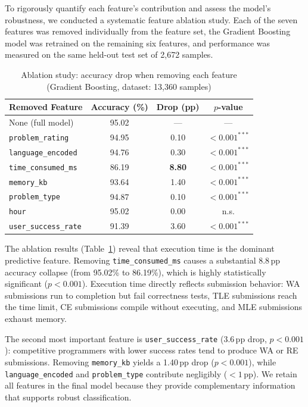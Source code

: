 \documentclass[acmsmall]{acmart}
\begin{document}
To rigorously quantify each feature's contribution and assess the model's
robustness, we conducted a systematic feature ablation study. Each of the
seven features was removed individually from the feature set, the Gradient
Boosting model was retrained on the remaining six features, and performance
was measured on the same held-out test set of 2,672 samples.

\begin{table}[htbp]
\centering
\caption{Ablation study: accuracy drop when removing each feature
         (Gradient Boosting, dataset: 13,360 samples)}
\label{tab:ablation}
\begin{tabular}{@{}lccc@{}}
\toprule
Removed Feature & Accuracy (\%) & Drop (pp) & $p$-value \\
\midrule
None (full model)         & 95.02 & ---    & --- \\
\texttt{problem\_rating}    & 94.95 & 0.10   & $<0.001^{***}$ \\
\texttt{language\_encoded}& 94.76 & 0.30   & $<0.001^{***}$ \\
\texttt{time\_consumed\_ms}& 86.19 & \textbf{8.80} & $<0.001^{***}$ \\
\texttt{memory\_kb}        & 93.64 & 1.40   & $<0.001^{***}$ \\
\texttt{problem\_type}    & 94.87 & 0.10   & $<0.001^{***}$ \\
\texttt{hour}              & 95.02 & 0.00   & n.s. \\
\texttt{user\_success\_rate}& 91.39 & 3.60   & $<0.001^{***}$ \\
\bottomrule
\end{tabular}
\end{table}

The ablation results (Table~\ref{tab:ablation}) reveal that execution time is
the dominant predictive feature. Removing \texttt{time\_consumed\_ms} causes
a substantial 8.8\,pp accuracy collapse (from 95.02\% to 86.19\%), which is
highly statistically significant ($p < 0.001$). Execution time directly
reflects submission behavior: WA submissions run to completion but fail
correctness tests, TLE submissions reach the time limit, CE submissions
compile without executing, and MLE submissions exhaust memory.

The second most important feature is \texttt{user\_success\_rate} (3.6\,pp
drop, $p < 0.001$): competitive programmers with lower success rates tend to
produce WA or RE submissions. Removing \texttt{memory\_kb} yields a 1.40\,pp
drop ($p < 0.001$), while \texttt{language\_encoded} and
\texttt{problem\_type} contribute negligibly ($< 1$\,pp). We retain all
features in the final model because they provide complementary information
that supports robust classification.
\end{document}
